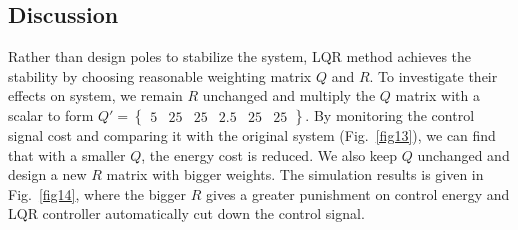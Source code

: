 \documentclass[hyperref]{article}
\theoremstyle{nonumberplain}
\begin{document}
	\subsection{Discussion}
	
	\hspace{1.0em}
	Rather than design poles to stabilize the system, LQR method achieves the stability by choosing reasonable weighting matrix $Q$ and $R$. To investigate their effects on system, we remain $R$ unchanged and multiply the $Q$ matrix with a scalar to form ${Q}'=\begin{Bmatrix}
	5&  25&  25&  2.5&  25& 25
	\end{Bmatrix}$. By monitoring the control signal cost and comparing it with the original system (Fig.~\ref{fig13}), we can find that with a smaller $Q$, the energy cost is reduced. We also keep $Q$ unchanged and design a new $R$ matrix with bigger weights. The simulation results is given in Fig.~\ref{fig14}, where the bigger $R$ gives a greater punishment on control energy and LQR controller automatically cut down the control signal.
	
\end{document}
